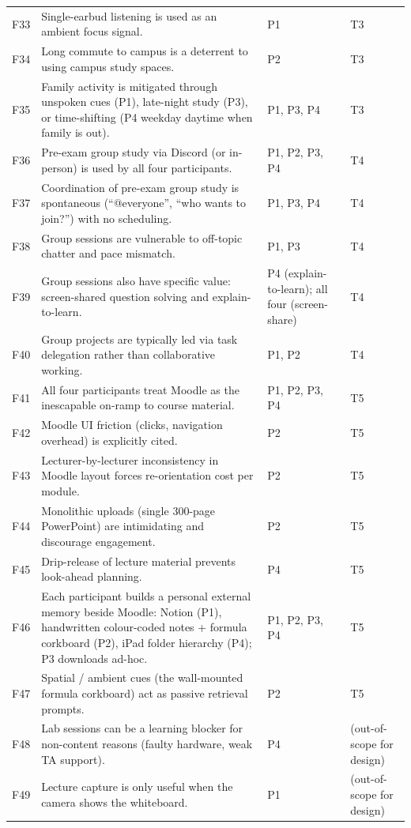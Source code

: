 \documentclass[a4paper,11pt]{article}
\begin{document}
\begin{longtable}{@{}>{\raggedright\arraybackslash}p{0.8cm}>{\raggedright\arraybackslash}p{10.4cm}>{\raggedright\arraybackslash}p{2.6cm}>{\raggedright\arraybackslash}p{1.5cm}@{}}
F33 & Single-earbud listening is used as an ambient focus signal. & P1 & T3 \\
F34 & Long commute to campus is a deterrent to using campus study spaces. & P2 & T3 \\
F35 & Family activity is mitigated through unspoken cues (P1), late-night study (P3), or time-shifting (P4 weekday daytime when family is out). & P1, P3, P4 & T3 \\
F36 & Pre-exam group study via Discord (or in-person) is used by all four participants. & P1, P2, P3, P4 & T4 \\
F37 & Coordination of pre-exam group study is spontaneous (``@everyone'', ``who wants to join?'') with no scheduling. & P1, P3, P4 & T4 \\
F38 & Group sessions are vulnerable to off-topic chatter and pace mismatch. & P1, P3 & T4 \\
F39 & Group sessions also have specific value: screen-shared question solving and explain-to-learn. & P4 (explain-to-learn); all four (screen-share) & T4 \\
F40 & Group projects are typically led via task delegation rather than collaborative working. & P1, P2 & T4 \\
F41 & All four participants treat Moodle as the inescapable on-ramp to course material. & P1, P2, P3, P4 & T5 \\
F42 & Moodle UI friction (clicks, navigation overhead) is explicitly cited. & P2 & T5 \\
F43 & Lecturer-by-lecturer inconsistency in Moodle layout forces re-orientation cost per module. & P2 & T5 \\
F44 & Monolithic uploads (single 300-page PowerPoint) are intimidating and discourage engagement. & P2 & T5 \\
F45 & Drip-release of lecture material prevents look-ahead planning. & P4 & T5 \\
F46 & Each participant builds a personal external memory beside Moodle: Notion (P1), handwritten colour-coded notes + formula corkboard (P2), iPad folder hierarchy (P4); P3 downloads ad-hoc. & P1, P2, P3, P4 & T5 \\
F47 & Spatial / ambient cues (the wall-mounted formula corkboard) act as passive retrieval prompts. & P2 & T5 \\
F48 & Lab sessions can be a learning blocker for non-content reasons (faulty hardware, weak TA support). & P4 & (out-of-scope for design) \\
F49 & Lecture capture is only useful when the camera shows the whiteboard. & P1 & (out-of-scope for design) \\
\bottomrule
\end{longtable}
\end{document}
